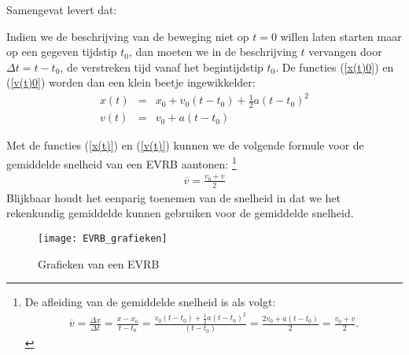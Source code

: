 \documentclass{ximera}
\begin{document}
	Samengevat levert dat:
	
	
	Indien we de beschrijving van de beweging niet op $t=0$ willen laten starten maar op een gegeven tijdstip $t_0$, dan moeten we in de beschrijving $t$ vervangen door $\Delta t= t-t_0$, de verstreken tijd vanaf het begintijdstip $t_0$. De functies (\ref{x(t)0}) en (\ref{v(t)0}) worden dan een klein beetje ingewikkelder:
	\begin{eqnarray}
	x(t)&=&x_0+v_0(t-t_0)+\frac{1}{2}a(t-t_0)^2\label{x(t)}\\
	v(t)&=&v_0+a(t-t_0)\label{v(t)}
	\end{eqnarray}
	
	Met de functies (\ref{x(t)}) en (\ref{v(t)}) kunnen we de volgende formule voor de gemiddelde snelheid van een EVRB aantonen:%
	\footnote{De afleiding van de gemiddelde snelheid is als volgt:
	\begin{eqnarray*}
	\overline{v}=\frac{\Delta x}{\Delta t}=\frac{x-x_0}{t-t_0}=\frac{v_0(t-t_0)+\frac{1}{2}a(t-t_0)^2}{(t-t_0)}=\frac{2v_0+a(t-t_0)}{2}=\frac{v_0+v}{2}.
	\end{eqnarray*}}
	\begin{eqnarray*}
	  \overline{v}=\frac{v_0+v}{2}
	\end{eqnarray*}
	Blijkbaar houdt het eenparig toenemen van de snelheid in dat we het rekenkundig gemiddelde kunnen gebruiken voor de gemiddelde snelheid.
	
	\newpage
	
	\begin{figure}[h]
	\centering
	\texttt{[image: EVRB\_grafieken]}
	\caption{Grafieken van een EVRB}
	\end{figure}
	
\end{document}
